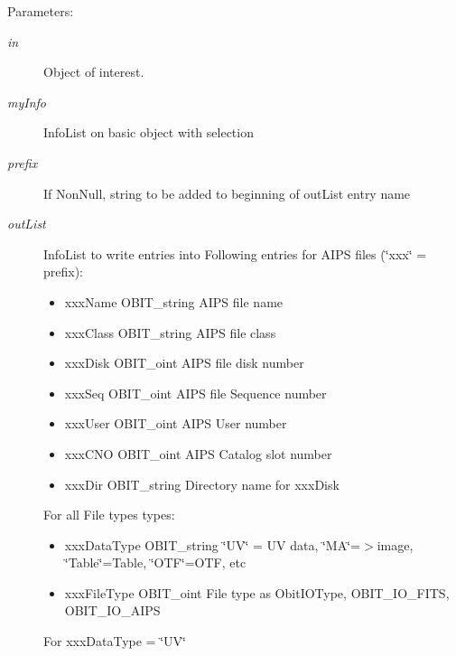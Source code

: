 \begin{Desc}
\item[Parameters:]
\begin{description}
\item[{\em in}]Object of interest. \item[{\em my\-Info}]Info\-List on basic object with selection \item[{\em prefix}]If Non\-Null, string to be added to beginning of out\-List entry name \item[{\em out\-List}]Info\-List to write entries into Following entries for AIPS files (\char`\"{}xxx\char`\"{} = prefix): \begin{itemize}
\item xxx\-Name OBIT\_\-string AIPS file name \item xxx\-Class OBIT\_\-string AIPS file class \item xxx\-Disk OBIT\_\-oint AIPS file disk number \item xxx\-Seq OBIT\_\-oint AIPS file Sequence number \item xxx\-User OBIT\_\-oint AIPS User number \item xxx\-CNO OBIT\_\-oint AIPS Catalog slot number \item xxx\-Dir OBIT\_\-string Directory name for xxx\-Disk\end{itemize}
For all File types types: \begin{itemize}
\item xxx\-Data\-Type OBIT\_\-string \char`\"{}UV\char`\"{} = UV data, \char`\"{}MA\char`\"{}=$>$image, \char`\"{}Table\char`\"{}=Table, \char`\"{}OTF\char`\"{}=OTF, etc \item xxx\-File\-Type OBIT\_\-oint File type as Obit\-IOType, OBIT\_\-IO\_\-FITS, OBIT\_\-IO\_\-AIPS\end{itemize}
For xxx\-Data\-Type = \char`\"{}UV\char`\"{} \begin{itemize}

\end{itemize}
\end{description}
\end{Desc}
